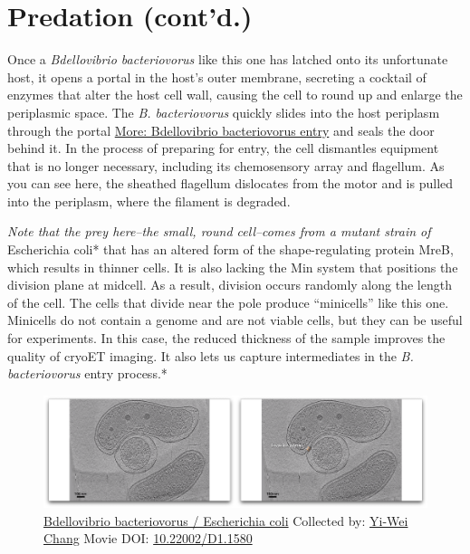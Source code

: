 \documentclass[]{tufte-book}
\begin{document}
\section{Predation (cont'd.)}\label{predation-contd.}

Once a \emph{Bdellovibrio bacteriovorus} like this one has latched onto
its unfortunate host, it opens a portal in the host's outer membrane,
secreting a cocktail of enzymes that alter the host cell wall, causing
the cell to round up and enlarge the periplasmic space. The \emph{B.
bacteriovorus} quickly slides into the host periplasm through the portal
\protect\hyperlink{Bdellovibrio_bacteriovorus_entry}{More: Bdellovibrio
bacteriovorus entry} and seals the door behind it. In the process of
preparing for entry, the cell dismantles equipment that is no longer
necessary, including its chemosensory array and flagellum. As you can
see here, the sheathed flagellum dislocates from the motor and is pulled
into the periplasm, where the filament is degraded.

\emph{Note that the prey here--the small, round cell--comes from a
mutant strain of }Escherichia coli* that has an altered form of the
shape-regulating protein MreB, which results in thinner cells. It is
also lacking the Min system that positions the division plane at
midcell. As a result, division occurs randomly along the length of the
cell. The cells that divide near the pole produce ``minicells'' like
this one. Minicells do not contain a genome and are not viable cells,
but they can be useful for experiments. In this case, the reduced
thickness of the sample improves the quality of cryoET imaging. It also
lets us capture intermediates in the \emph{B. bacteriovorus} entry
process.*






\begin{figure}
\includegraphics{movie_stills/9_10} \caption[\protect\hyperlink{tree}{Bdellovibrio bacteriovorus /
Escherichia coli} Collected by: \protect\hyperlink{yi-wei_chang}{Yi-Wei
Chang} Movie DOI:
\href{https://doi.org/10.22002/D1.1580}{10.22002/D1.1580}]{\protect\hyperlink{tree}{Bdellovibrio bacteriovorus /
Escherichia coli} Collected by: \protect\hyperlink{yi-wei_chang}{Yi-Wei
Chang} Movie DOI:
\href{https://doi.org/10.22002/D1.1580}{10.22002/D1.1580}}\label{fig:9-10}
\end{figure}
\end{document}
